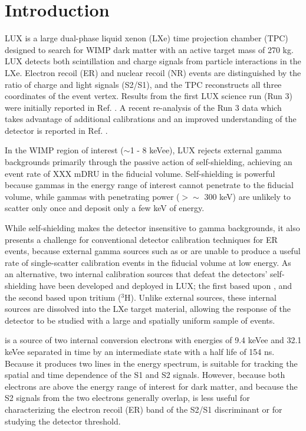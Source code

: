 \section{Introduction}

LUX is a large dual-phase liquid xenon (LXe) time projection chamber (TPC) designed to search for WIMP dark matter with an active target mass of 270 kg. LUX detects both scintillation and charge signals from particle interactions in the LXe. Electron recoil (ER) and nuclear recoil (NR) events are distinguished by the ratio of charge and light signals (S2/S1), and the TPC reconstructs all three coordinates of the event vertex. Results from the first LUX science run (Run 3) were initially reported in Ref. \cite{LUX_PRL}. A recent re-analysis of the Run 3 data which takes advantage of additional calibrations and an improved understanding of the detector is reported in Ref. \cite{lux-reanalysis}.

In the WIMP region of interest ($\sim$1 - 8 keVee), LUX rejects external gamma backgrounds primarily through the passive action of self-shielding, achieving an event rate of XXX mDRU in the fiducial volume.  Self-shielding is powerful because gammas in the energy range of interest cannot penetrate to the fiducial volume, while gammas with penetrating power ($> \sim$ 300 keV) are unlikely to scatter only once and deposit only a few keV of energy.

While self-shielding makes the detector insensitive to gamma backgrounds, it also presents a challenge for conventional detector calibration techniques for ER events, because  external gamma sources such as \cssrc or \thsrc are unable to produce a useful rate of single-scatter calibration events in the fiducial volume at low energy. As an alternative, two internal calibration sources that defeat the detectors' self-shielding have been developed and deployed in LUX; the first based upon \krsrc\cite{Kastens:2009rt}, and the second based upon tritium ($^{3}$H). Unlike external sources, these internal sources are dissolved into the LXe target material, allowing the response of the detector to be studied with a large and spatially uniform sample of events.

\krsrc is a source of two internal conversion electrons with energies of 9.4 keVee and 32.1 keVee separated in time by an intermediate state with a half life of 154 ns\cite{83Kr_HalfLife_1}\cite{83Kr_HalfLife_2}. Because it produces two lines in the energy spectrum, \krsrc is suitable for tracking the spatial and time dependence of the S1 and S2 signals. However, because both \krsrc electrons are above the energy range of interest for dark matter, and because the S2 signals from the two electrons generally overlap,  \krsrc is less useful for characterizing the electron recoil (ER) band of the S2/S1 discriminant or for studying the detector threshold.

